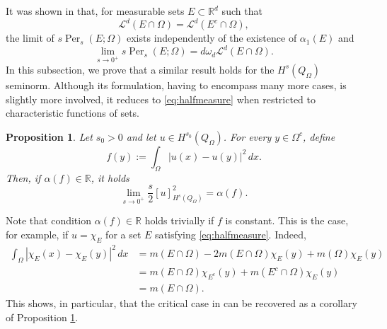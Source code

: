 \documentclass[reqno,11pt]{amsart}
\numberwithin{equation}{section}
\theoremstyle{definition} %
\theoremstyle{plain}
\newtheorem{prop}[prop]{Proposition}
\newtheorem{lemma}[lemma]{Lemma}
\theoremstyle{definition}
\theoremstyle{remark}
\def\elle#1{L^{#1}}
\def\Qom{{Q_\Omega}}
\def\O{\Omega}
\def\o{\omega}
\def\io{\int_\Omega}
\def\semin#1#2{ [#1 ]_{#2}}
\def\L{\mathcal{L}}
\def\R{\mathbb{R}}
\def\Rd{\mathbb{R}^d}
\newcommand{\abs}[1]{\left|#1\right|}
\begin{document}
It was shown in \cite{Quartet} that, for measurable sets $E\subset\R^d$ such that
\begin{equation}\label{eq:halfmeasure}
    \L^d(E\cap\O)=\L^d(E^c\cap \O),
\end{equation}
the limit of $s\operatorname{Per}_s(E;\O)$ exists independently of the existence of $\alpha_1(E)$ and
\[
\lim_{s\to0^+}s\operatorname{Per}_s(E;\O)=d\o_d\L^d(E\cap\O).
\]
In this subsection, we prove that
a similar result holds for the $H^s(\Qom)$ seminorm. Although its formulation, having to encompass many more cases, is slightly more involved,  it reduces to \eqref{eq:halfmeasure} when restricted to characteristic functions of sets.


\begin{prop}\label{prop:casocritico}
    Let $s_0>0$ and let $u\in H^{s_0}(\Qom)$. For every $y\in\O^c$, define
    \[
    f(y):=\io\abs{u(x)-u(y)}^2\,dx.
    \]
    Then, if $\alpha(f)\in\R$, it holds
    \begin{equation}
        \lim_{s\to0^+}\frac{s}{2}\semin{u}{H^s(\Qom)}^2=\alpha(f).
    \end{equation}
\end{prop}
Note that condition $\alpha(f)\in\R$ holds trivially if $f$ is constant. This is the case, for example, if $u=\chi_E$ for a set $E$ satisfying \eqref{eq:halfmeasure}. Indeed,
\begin{equation}
    \begin{split}
        \io\abs{\chi_E(x)-\chi_E(y)}^2\,dx&=m(E\cap\O)-2m(E\cap\O)\chi_E(y)+m(\O)\chi_E(y)\\
        &=m(E\cap\O)\chi_{E^c}(y)+m(E^c\cap\O)\chi_E(y)\\
        &=m(E\cap\O).
    \end{split}
\end{equation}
This shows, in particular, that the critical case in \cite{Quartet} can be recovered as a corollary of Proposition \ref{prop:casocritico}.
\end{document}
